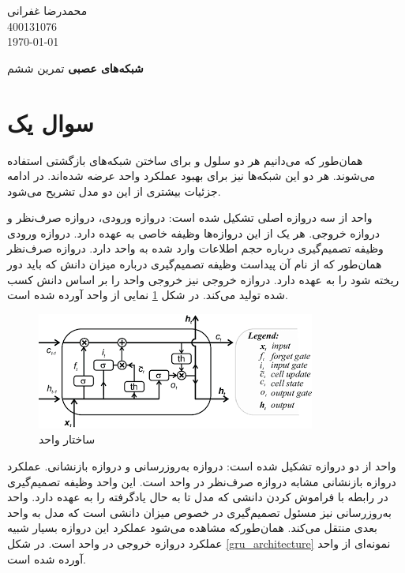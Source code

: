 \documentclass[12pt, a4paper]{book}
\newcommand{\coursetitle}{شبکه‌های عصبی}
\newcommand{\doctitle}{تمرین ششم}
\newcommand{\name}{محمدرضا غفرانی}
\newcommand{\studentno}{400131076}
\newcommand{\todaydate}{\today}
\begin{document}
\begin{flushleft}
    \name \\
    \studentno \\
    \todaydate
\end{flushleft}

\begin{center}
    \huge
    \textbf{\coursetitle}
    \break
    \large
    \doctitle
\end{center}

\thispagestyle{plain}

\section*{سوال یک}

هما‌‌ن‌طور که می‌دانیم هر دو سلول  و  برای ساختن شبکه‌های بازگشتی استفاده می‌شوند. هر دو این شبکه‌ها نیز برای
بهبود عملکرد واحد  عرضه شده‌اند. در ادامه جزئیات بیشتری از این دو مدل تشریح می‌شود.

واحد  از سه دروازه اصلی تشکیل شده است: دروازه ورودی، دروازه صرف‌نظر و دروازه
خروجی. هر یک از این دروازه‌ها وظیفه خاصی به عهده دارد. دروازه ورودی وظیفه تصمیم‌گیری درباره حجم اطلاعات وارد
شده به واحد  دارد. دروازه صرف‌نظر همان‌طور که از نام‌ آن پیداست وظیفه تصمیم‌گیری درباره میزان دانش
که باید دور ریخته شود را به عهده دارد. دروازه خروجی نیز خروجی واحد  را بر اساس دانش کسب شده
تولید می‌کند. در شکل \ref{lstm_architecture} نمایی از واحد  آورده شده است.

\begin{figure}[h]
    \centering
    \includegraphics[width=0.55\linewidth]{images/q1/lstm.png}
    \caption{ساختار واحد }
    \label{lstm_architecture}
\end{figure}

واحد  از دو دروازه تشکیل شده است: دروازه به‌روزرسانی و دروازه بازنشانی.
عملکرد دروازه بازنشانی مشابه دروازه صرف‌نظر در واحد  است. این واحد وظیفه تصمیم‌گیری در رابطه با فراموش کردن
دانشی که مدل تا به حال یادگرفته را به عهده دارد. واحد به‌روزرسانی نیز مسئول تصمیم‌گیری در خصوص میزان دانشی است
که مدل به واحد بعدی منتقل می‌کند. همان‌طورکه مشاهده می‌شود عملکرد این دروازه بسیار شبیه عملکرد دروازه خروجی در واحد
 است. در شکل \ref{gru_architecture} نمونه‌ای از واحد  آورده شده است.
\end{document}
